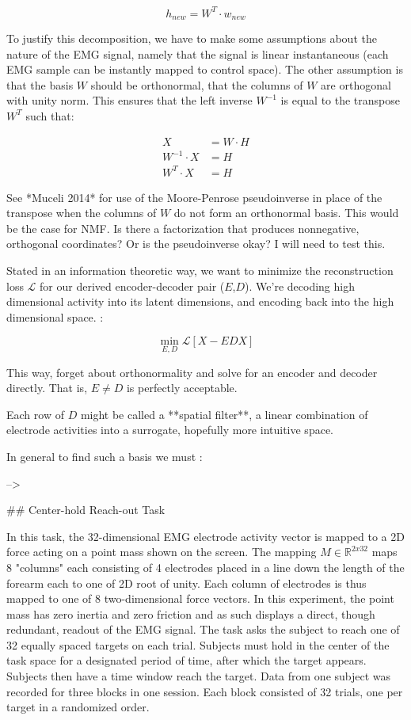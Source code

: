 \documentclass[../main.tex]{subfiles}
\begin{document}
{{{{{{$$
h_{new} = W^T\cdot{w_{new}}
$$

To justify this decomposition, we have to make some assumptions about the nature of the EMG signal, namely that the signal is linear instantaneous (each EMG sample can be instantly mapped to control space). The other assumption is that the basis $W$ should be orthonormal, that the columns of $W$ are orthogonal with unity norm. This ensures that the left inverse $W^{-1}$ is equal to the transpose $W^T$ such that:

\begin{align*}
X &= W\cdot{H} \\
W^{-1}\cdot{X} &= {H} \\
W^{T}\cdot{X} &= {H}
\end{align*}

See *Muceli 2014* for use of the Moore-Penrose pseudoinverse in place of the transpose when the columns of $W$ do not form an orthonormal basis. This would be the case for NMF. Is there a factorization that produces nonnegative, orthogonal coordinates? Or is the pseudoinverse okay? I will need to test this.

Stated in an information theoretic way, we want to minimize the reconstruction loss $\mathcal{L}$ for our derived encoder-decoder pair ($E$,$D$). We're decoding high dimensional activity into its latent dimensions, and encoding back into the high dimensional space. :

$$
\min_{E,D}{\mathcal{L}\left[X - EDX\right]}
$$

This way, forget about orthonormality and solve for an encoder and decoder directly. That is, $E\neq{D}$ is perfectly acceptable.

Each row of $D$ might be called a **spatial filter**, a linear combination of electrode activities into a surrogate, hopefully more intuitive space.

In general to find such a basis we must :

--> 

## Center-hold Reach-out Task

In this task, the 32-dimensional EMG electrode activity vector is mapped to a 2D force acting on a point mass shown on the screen. The mapping $M\in\mathbb{R}^{2x32}$ maps 8 "columns" each consisting of 4 electrodes placed in a line down the length of the forearm each to one of 2D root of unity. Each column of electrodes is thus mapped to one of 8 two-dimensional force vectors. In this experiment, the point mass has zero inertia and zero friction and as such displays a direct, though redundant, readout of the EMG signal. The task asks the subject to reach one of 32 equally spaced targets on each trial. Subjects must hold in the center of the task space for a designated period of time, after which the target appears. Subjects then have a time window reach the target. Data from one subject was recorded for three blocks in one session. Each block consisted of 32 trials, one per target in a randomized order.

}}}}}}
\end{document}
